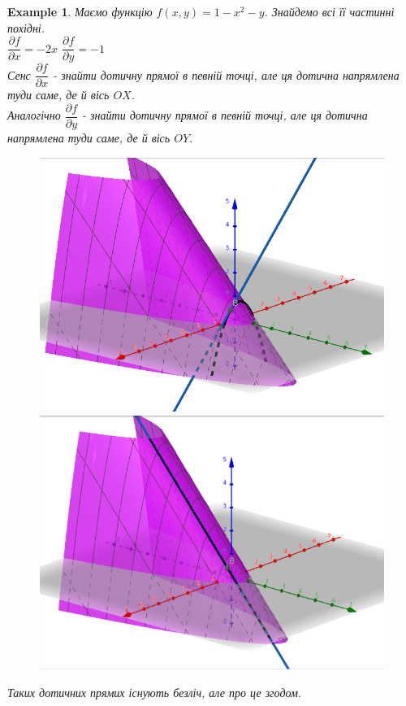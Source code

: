 \documentclass[a4paper, 10pt]{article}
\def\departial#1#2{\dfrac{\partial {#1}}{\partial {#2}}}
\theoremstyle{theoremdd}
\theoremstyle{theoremdd}
\theoremstyle{theoremdd}
\theoremstyle{theoremdd}
\theoremstyle{theoremdd}
\newtheorem{example}[theorem]{Example}
\theoremstyle{theoremdd}
\theoremstyle{theoremdd}
\theoremstyle{theoremdd}
\theoremstyle{theoremdd}
\begin{document}
\begin{example}
Маємо функцію $f(x,y) = 1 - x^2 - y$. Знайдемо всі її частинні похідні.\\
$\departial{f}{x} = -2x$ \hspace{2cm} $\departial{f}{y} = -1$
\bigskip \\
Сенс $\departial{f}{x}$ - знайти дотичну прямої в певній точці, але ця дотична напрямлена туди саме, де й вісь $OX$.\\
Аналогічно $\departial{f}{y}$ - знайти дотичну прямої в певній точці, але ця дотична напрямлена туди саме, де й вісь $OY$.
\begin{figure}[H]
\centering
\includegraphics[scale=0.24]{tangent.png}
\qquad
\includegraphics[scale=0.24]{tangent2.png}
\end{figure}
Таких дотичних прямих існують безліч, але про це згодом.
\end{example}
\end{document}
